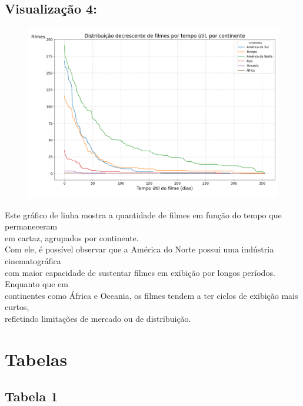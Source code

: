 \documentclass{article}
\begin{document}
\subsection*{Visualização 4:}
\begin{figure}[H]
    \centerline{\includegraphics[width = \linewidth]{img/Figure_4.png}}
\end{figure}

Este gráfico de linha mostra a quantidade de filmes em função do tempo que permaneceram\\
em cartaz, agrupados por continente.\\
 Com ele, é possível observar que a América do Norte possui uma indústria cinematográfica\\
com maior capacidade de sustentar filmes em exibição por longos períodos. Enquanto que em \\
continentes como África e Oceania, os filmes tendem a ter ciclos de exibição mais curtos, \\
refletindo limitações de mercado ou de distribuição.\\

\section*{Tabelas}

\subsection*{Tabela 1}
\end{document}
